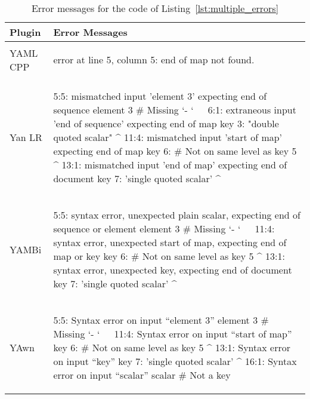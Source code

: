 \begin{table}[H]
  \caption{Error messages for the  code of Listing~\ref{lst:multiple_errors}}
  \label{tab:error_messages_final_multiple_errors}
  \centering

  \begin{adjustbox}{max width=\textwidth}
  \begin{tabular}{lp{}}
    \toprule
    Plugin & Error Messages\\
    \midrule

    \vspace{0cm}
    YAML CPP &
    \vspace{-0.36cm}
    \begin{textcode}
      error at line 5, column 5: end of map not found.
    \end{textcode}
    \\

    \vspace{0cm}
    Yan LR &
    \vspace{-0.36cm}
    \begin{textcode}
      5:5: mismatched input 'element 3' expecting end of sequence
               element 3 # Missing `- `
               ^^^^^^^^^
      6:1: extraneous input 'end of sequence' expecting end of map
           key 3: "double quoted scalar"
           ^
      11:4: mismatched input 'start of map' expecting end of map
               key 6: # Not on same level as key 5
               ^
      13:1: mismatched input 'end of map' expecting end of document
            key 7: 'single quoted scalar'
            ^
    \end{textcode}
    \\

    \vspace{0cm}
    YAMBi &
    \vspace{-0.36cm}
    \begin{textcode}
      5:5: syntax error, unexpected plain scalar,
           expecting end of sequence or element
               element 3 # Missing `- `
               ^^^^^^^^^
      11:4: syntax error, unexpected start of map,
            expecting end of map or key
               key 6: # Not on same level as key 5
               ^
      13:1: syntax error, unexpected key, expecting end of document
            key 7: 'single quoted scalar'
            ^
    \end{textcode}
    \\

    \vspace{0cm}
    YAwn &
    \vspace{-0.36cm}
    \begin{textcode}
      5:5: Syntax error on input “element 3”
               element 3 # Missing `- `
               ^^^^^^^^^
      11:4: Syntax error on input “start of map”
               key 6: # Not on same level as key 5
               ^
      13:1: Syntax error on input “key”
            key 7: 'single quoted scalar'
            ^
      16:1: Syntax error on input “scalar”
            scalar # Not a key
            ^^^^^^
    \end{textcode}
    \\


\end{tabular}
\end{adjustbox}
\end{table}

